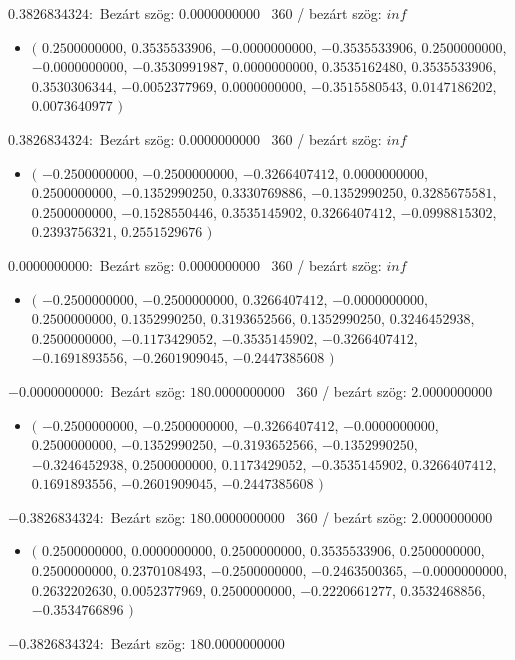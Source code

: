 \documentclass[14pt,a4paper]{article}
\begin{document}
$0.3826834324$:\
Bezárt szög: $0.0000000000$ \
360 / bezárt szög: $inf$\
\begin{itemize}
\item
$\big($
$0.2500000000$, $0.3535533906$, $-0.0000000000$, $-0.3535533906$, $0.2500000000$, $-0.0000000000$, $-0.3530991987$, $0.0000000000$, $0.3535162480$, $0.3535533906$, $0.3530306344$, $-0.0052377969$, $0.0000000000$, $-0.3515580543$, $0.0147186202$, $0.0073640977$
$\big)$
\end{itemize}
$0.3826834324$:\
Bezárt szög: $0.0000000000$ \
360 / bezárt szög: $inf$\
\begin{itemize}
\item
$\big($
$-0.2500000000$, $-0.2500000000$, $-0.3266407412$, $0.0000000000$, $0.2500000000$, $-0.1352990250$, $0.3330769886$, $-0.1352990250$, $0.3285675581$, $0.2500000000$, $-0.1528550446$, $0.3535145902$, $0.3266407412$, $-0.0998815302$, $0.2393756321$, $0.2551529676$
$\big)$
\end{itemize}
$0.0000000000$:\
Bezárt szög: $0.0000000000$ \
360 / bezárt szög: $inf$\
\begin{itemize}
\item
$\big($
$-0.2500000000$, $-0.2500000000$, $0.3266407412$, $-0.0000000000$, $0.2500000000$, $0.1352990250$, $0.3193652566$, $0.1352990250$, $0.3246452938$, $0.2500000000$, $-0.1173429052$, $-0.3535145902$, $-0.3266407412$, $-0.1691893556$, $-0.2601909045$, $-0.2447385608$
$\big)$
\end{itemize}
$-0.0000000000$:\
Bezárt szög: $180.0000000000$ \
360 / bezárt szög: $2.0000000000$\
\begin{itemize}
\item
$\big($
$-0.2500000000$, $-0.2500000000$, $-0.3266407412$, $-0.0000000000$, $0.2500000000$, $-0.1352990250$, $-0.3193652566$, $-0.1352990250$, $-0.3246452938$, $0.2500000000$, $0.1173429052$, $-0.3535145902$, $0.3266407412$, $0.1691893556$, $-0.2601909045$, $-0.2447385608$
$\big)$
\end{itemize}
$-0.3826834324$:\
Bezárt szög: $180.0000000000$ \
360 / bezárt szög: $2.0000000000$\
\begin{itemize}
\item
$\big($
$0.2500000000$, $0.0000000000$, $0.2500000000$, $0.3535533906$, $0.2500000000$, $0.2500000000$, $0.2370108493$, $-0.2500000000$, $-0.2463500365$, $-0.0000000000$, $0.2632202630$, $0.0052377969$, $0.2500000000$, $-0.2220661277$, $0.3532468856$, $-0.3534766896$
$\big)$
\end{itemize}
$-0.3826834324$:\
Bezárt szög: $180.0000000000$ \
\end{document}
